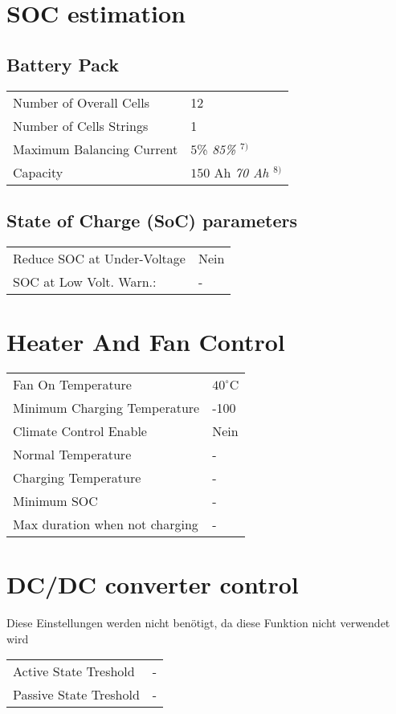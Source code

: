 \section*{SOC estimation}
\subsection*{Battery Pack}
\begin{tabular}{p{11cm}p{3cm}}
	Number of Overall Cells & 12 \\
	Number of Cells Strings & 1 \\
	Maximum Balancing Current & $5$\% \textit{85\% $^{7)}$} \\
	Capacity & $150$ Ah \textit{70 Ah $^{8)}$}
\end{tabular}

\subsection*{State of Charge (SoC) parameters}
\begin{tabular}{p{11cm}p{2cm}}
	Reduce SOC at Under-Voltage & Nein \\
	SOC at Low Volt. Warn.: & -
\end{tabular}

\section*{Heater And Fan Control}
\begin{tabular}{p{11cm}p{2cm}}
	Fan On Temperature & $40^\circ$C \\
	Minimum Charging Temperature & -100 \\
	Climate Control Enable & Nein \\
	Normal Temperature & - \\
	Charging Temperature & - \\
	Minimum SOC & - \\
	Max duration when not charging & -
\end{tabular}

\section*{DC/DC converter control}
Diese Einstellungen werden nicht benötigt, da diese Funktion nicht verwendet wird \\
\begin{tabular}{p{11cm}p{2cm}}
	Active State Treshold & - \\
	Passive State Treshold & -
\end{tabular}

